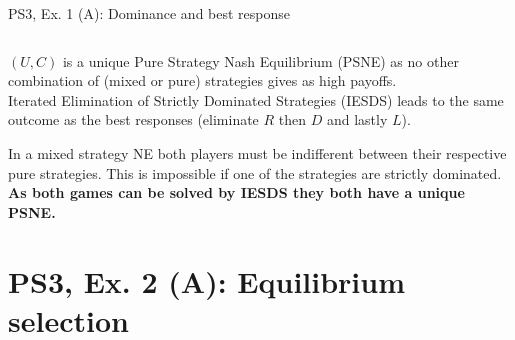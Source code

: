 \begin{frame}{PS3, Ex. 1 (A): Dominance and best response}
\begin{multicols}{2}
\begin{table}
\begin{tabular}{cc|c|c|c|}
      \end{tabular}
    \end{table}
    $(U,C)$ is a unique Pure Strategy Nash Equilibrium (PSNE) as no other combination of (mixed or pure) strategies gives as high payoffs.\\\medskip
    Iterated Elimination of Strictly Dominated Strategies (IESDS) leads to the same outcome as the best responses (eliminate $R$ then $D$ and lastly $L$).
  \vfill\null
  \end{multicols}
  \vspace{-20pt}
  In a mixed strategy NE both players must be indifferent between their respective pure strategies. This is impossible if one of the strategies are strictly dominated.\\\medskip
  \textbf{As both games can be solved by IESDS they both have a unique PSNE.}
\end{frame}


\section{PS3, Ex. 2 (A): Equilibrium selection}

